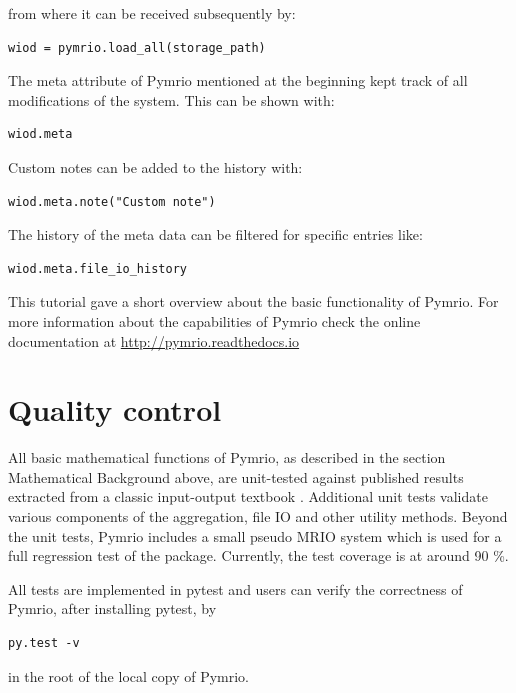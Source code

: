 \documentclass{jors}
\begin{document}
from where it can be received subsequently by:

\begin{lstlisting}
wiod = pymrio.load_all(storage_path)
\end{lstlisting}

The meta attribute of Pymrio mentioned at the beginning kept track of all modifications of the system.
This can be shown with:

\begin{lstlisting}
wiod.meta
\end{lstlisting}

Custom notes can be added to the history with:
\begin{lstlisting}
wiod.meta.note("Custom note")
\end{lstlisting}


The history of the meta data can be filtered for specific entries like:

\begin{lstlisting}
wiod.meta.file_io_history
\end{lstlisting}


This tutorial gave a short overview about the basic functionality of Pymrio. 
For more information about the capabilities of Pymrio check the online documentation at 
\url{http://pymrio.readthedocs.io} 
\cite{stadler2018_pymrio}



\section*{Quality control}

All basic mathematical functions of Pymrio, as described in the section Mathematical Background above, are unit-tested against published results extracted from a classic input-output textbook \cite{miller2009_Inputoutput}.
Additional unit tests validate various components of the aggregation, file IO and other utility methods.
Beyond the unit tests, Pymrio includes a small pseudo MRIO system which is used for a full regression test of the package. Currently, the test coverage is at around 90 \%. 

All tests are implemented in pytest and users can verify the correctness of Pymrio, after installing pytest, by

\begin{lstlisting}
py.test -v
\end{lstlisting}

in the root of the local copy of Pymrio.
\end{document}
